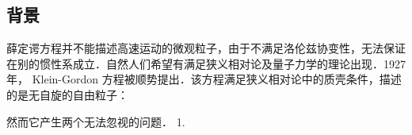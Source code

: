 
\subsection{背景}
薛定谔方程并不能描述高速运动的微观粒子，由于不满足洛伦兹协变性，无法保证在别的惯性系成立．自然人们希望有满足狭义相对论及量子力学的理论出现．1927年， Klein-Gordon 方程被顺势提出．该方程满足狭义相对论中的质壳条件，描述的是无自旋的自由粒子：

然而它产生两个无法忽视的问题．
1.